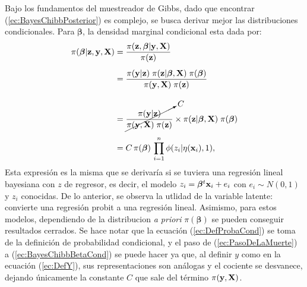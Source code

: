 \documentclass[../Main/Main.tex]{subfiles}
\begin{document}
Bajo los fundamentos del muestreador de Gibbs, dado que encontrar (\ref{ec:BayesChibbPosterior}) es complejo, se busca derivar mejor las distribuciones condicionales. Para $\bm{\beta}$, la densidad marginal condicional esta dada por:
\begin{align}
	\pi(\bm{\beta}|\mathbf{z},\mathbf{y},\mathbf{X})
	& = \dfrac{\pi(\mathbf{z}, \bm{\beta}| \mathbf{y}, \mathbf{X})}{\pi(\mathbf{z})} 
	\label{ec:DefProbaCond}\\[5pt]
	& = \dfrac{\pi(\mathbf{y} | \mathbf{z})\;\pi(\mathbf{z}|\bm{\beta},\mathbf{X}) 
	\; \pi(\bm{\beta})}{\pi(\mathbf{y}, \mathbf{X}) \; \pi(\mathbf{z})} \nonumber \\[10pt]
	& = \cancelto{C}{\dfrac{\pi(\mathbf{y} | \mathbf{z})}{\pi(\mathbf{y}, \mathbf{X}) \; \pi(\mathbf{z})}} \times \pi(\mathbf{z}|\bm{\beta},\mathbf{X}) \; \pi(\bm{\beta}) \label{ec:PasoDeLaMuerte} \\[5pt]
	& = C \,\pi(\bm{\beta}) \, \prod_{i = 1}^n\phi(z_i|\eta(\mathbf{x}_i),1), \label{ec:BayesChibbBetaCond}
\end{align}
Esta expresión es la misma que se derivaría si se tuviera una regresión lineal bayesiana con $z$ de regresor, es decir, el modelo $z_i = \bm{\beta}^t\mathbf{x}_i + e_i$ con $e_i \sim N(0,1)$ y $z_i$ conocidas. De lo anterior, se observa la utlidad de la variable latente: convierte una regresión probit a una regresión lineal. Asimismo, para estos modelos, dependiendo de la distribucion \textit{a priori} $\pi(\bm{\beta})$ se pueden conseguir resultados cerrados. Se hace notar que la ecuación (\ref{ec:DefProbaCond}) se toma de la definición de probabilidad condicional, y el paso de (\ref{ec:PasoDeLaMuerte}) a (\ref{ec:BayesChibbBetaCond}) se puede hacer ya que, al definir $y$ como en la ecuación (\ref{ec:DefY}), sus representaciones son análogas y el cociente se desvanece, dejando únicamente la constante $C$ que sale del término $\pi(\mathbf{y}, \mathbf{X})$.
\end{document}
